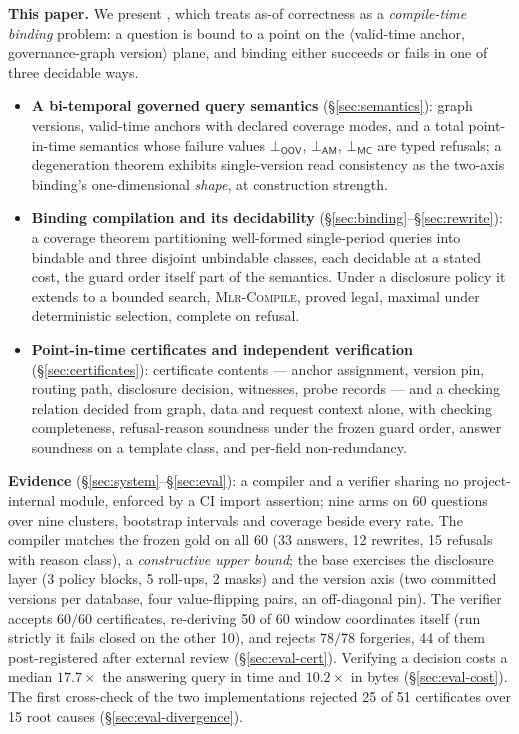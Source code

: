 \smallskip\noindent{}\textbf{This paper.} We present \sysname, which treats as-of
correctness as a \emph{compile-time binding} problem: a question is bound to a
point on the $\langle$valid-time anchor, governance-graph version$\rangle$
plane, and binding either succeeds or fails in one of three decidable ways.

\begin{itemize}
\item \textbf{A bi-temporal governed query semantics}
  (\S\ref{sec:semantics}): graph versions, valid-time anchors with declared
  coverage modes, and a total point-in-time semantics whose failure values
  $\bot_{\mathsf{OOV}}$, $\bot_{\mathsf{AM}}$, $\bot_{\mathsf{MC}}$ are typed
  refusals; a degeneration theorem exhibits single-version read
  consistency as the two-axis binding's one-dimensional \emph{shape}, at
  construction strength.
\item \textbf{Binding compilation and its decidability}
  (\S\ref{sec:binding}--\S\ref{sec:rewrite}): a coverage theorem partitioning
  well-formed single-period queries into bindable and three disjoint unbindable
  classes, each decidable at a stated cost, the guard order itself part of the
  semantics. Under a disclosure policy it extends to a bounded search,
  \textsc{Mlr-Compile}, proved legal, maximal under deterministic selection,
  complete on refusal.
\item \textbf{Point-in-time certificates and independent verification}
  (\S\ref{sec:certificates}): certificate contents --- anchor assignment,
  version pin, routing path, disclosure decision, witnesses, probe records ---
  and a checking relation decided from graph, data
  and request context alone, with checking completeness, refusal-reason
  soundness
  under the frozen guard order, answer soundness on a template class, and
  per-field non-redundancy.
\end{itemize}

\noindent{}\textbf{Evidence} (\S\ref{sec:system}--\S\ref{sec:eval}): a compiler
and a verifier sharing no project-internal module, enforced by a CI import
assertion; nine arms on 60 questions over nine clusters, bootstrap intervals
and coverage beside every rate. The compiler matches the frozen gold
on all 60 (33 answers, 12 rewrites, 15 refusals with reason class), a
\emph{constructive upper bound}; the base exercises the disclosure layer
(3 policy blocks, 5 roll-ups, 2 masks) and the version axis (two committed
versions per database, four value-flipping pairs,
an off-diagonal pin). The verifier accepts $60/60$ certificates,
re-deriving 50 of 60 window coordinates itself (run strictly it fails
closed on the other 10), and rejects $78/78$ forgeries, 44 of them
post-registered after
external review (\S\ref{sec:eval-cert}).
Verifying a decision costs a median
$17.7\times$ the answering query in time and $10.2\times$ in bytes
(\S\ref{sec:eval-cost}). The first cross-check of the two implementations rejected 25 of 51
certificates over 15 root causes (\S\ref{sec:eval-divergence}).

